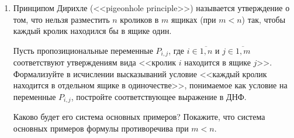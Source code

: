 \documentclass[10pt,a4paper,oneside]{article}
\begin{document}
\begin{enumerate}
\item Принципом Дирихле (<<pigeonhole principle>>) называется утверждение о том, что нельзя разместить $n$ кроликов в $m$ ящиках (при $m < n$) так, чтобы
каждый кролик находился бы в ящике один. 

Пусть пропозициональные переменные $P_{i,j}$, где $i \in \overline{1,n}$ и $j \in \overline{1,m}$ 
соответствуют утверждениям вида <<кролик $i$ находится в ящике $j$>>.
Формализуйте в исчислении высказываний условие 
<<каждый кролик находится в отдельном ящике в одиночестве>>,
понимаемое как условие на переменные $P_{i,j}$,
постройте соответствующее выражение в ДНФ. 

Каково будет его система основных примеров?
Покажите, что система основных примеров формулы противоречива при $m < n$.
\end{enumerate}
\end{document}
